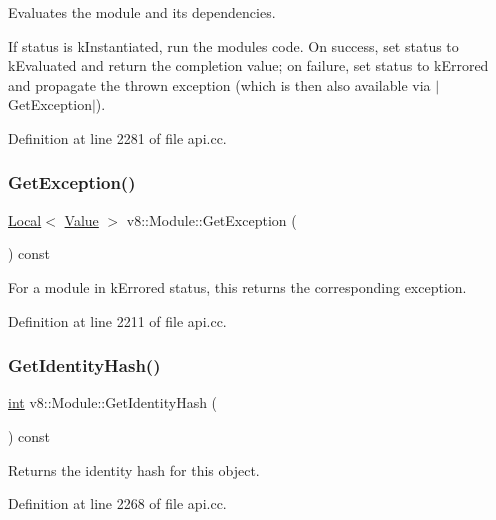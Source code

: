 Evaluates the module and its dependencies.

If status is k\+Instantiated, run the module\textquotesingle{}s code. On success, set status to k\+Evaluated and return the completion value; on failure, set status to k\+Errored and propagate the thrown exception (which is then also available via $\vert$\+Get\+Exception$\vert$). 

Definition at line 2281 of file api.\+cc.

\mbox{\label{classv8_1_1Module_a7a48405dcd0e84b6edc78e9b1424bbb4}} 
\subsubsection{\texorpdfstring{Get\+Exception()}{GetException()}}
{\footnotesize\ttfamily \mbox{\hyperlink{classv8_1_1Local}{Local}}$<$ \mbox{\hyperlink{classv8_1_1Value}{Value}} $>$ v8\+::\+Module\+::\+Get\+Exception (\begin{DoxyParamCaption}{ }\end{DoxyParamCaption}) const}

For a module in k\+Errored status, this returns the corresponding exception. 

Definition at line 2211 of file api.\+cc.

\mbox{\label{classv8_1_1Module_aa2966a54ccb783a91ab494407782e9e3}} 
\subsubsection{\texorpdfstring{Get\+Identity\+Hash()}{GetIdentityHash()}}
{\footnotesize\ttfamily \mbox{\hyperlink{classint}{int}} v8\+::\+Module\+::\+Get\+Identity\+Hash (\begin{DoxyParamCaption}{ }\end{DoxyParamCaption}) const}

Returns the identity hash for this object. 

Definition at line 2268 of file api.\+cc.

\mbox{\label{classv8_1_1Module_a314c33807e4f3d42a6442ce03c9eabee}} 

